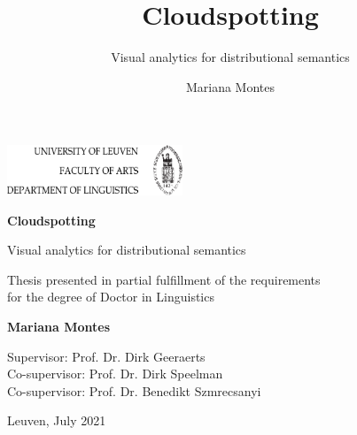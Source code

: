 \documentclass[
]{book}
\title{Cloudspotting}
\subtitle{Visual analytics for distributional semantics}
\author{Mariana Montes}
\date{}
\let\oldmaketitle\maketitle
\begin{document}
\maketitle




\thispagestyle{empty}
\begin{titlepage}
    \flushright
    \includegraphics[height=15mm]{assets/img/faculty_logo.png}
        
        
    \begin{center}
        \vspace*{4cm}
        \Huge
        \textbf{Cloudspotting}
            
        \vspace{0.5cm}
        \LARGE
        Visual analytics for distributional semantics
            
        \vfill
        
        \large  
        Thesis presented in partial fulfillment of the requirements\\
        for the degree of Doctor in Linguistics
        \vspace{0.8cm}
            
        \textbf{Mariana Montes}
            
        \vspace{1.5cm}
            
        Supervisor: Prof. Dr. Dirk Geeraerts\\
        Co-supervisor: Prof. Dr. Dirk Speelman\\
        Co-supervisor: Prof. Dr. Benedikt Szmrecsanyi\\
            
        \vspace{3cm}
            
        Leuven, July 2021
            
    \end{center}
\end{titlepage}
\end{document}
